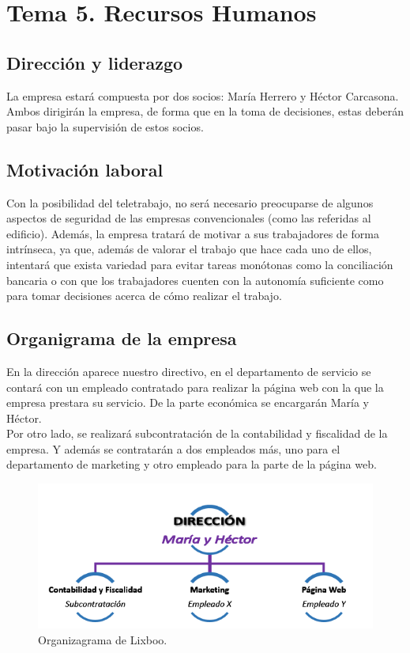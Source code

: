 \documentclass[openany,overnay,a4paper, twoside, 12pt]{book}
\begin{document}
\chapter*{Tema 5. Recursos Humanos}
\setcounter{section}{0}
\section{Dirección y liderazgo}
La empresa estará compuesta por dos socios: María Herrero y Héctor Carcasona. Ambos dirigirán la empresa, de forma que en la toma de decisiones, estas deberán pasar bajo la supervisión de estos socios.
\section{Motivación laboral}
Con la posibilidad del teletrabajo, no será necesario preocuparse de algunos aspectos de seguridad de las empresas convencionales (como las referidas al edificio).
Además, la empresa tratará de motivar a sus trabajadores de forma intrínseca, ya que, además de valorar el trabajo que hace cada uno de ellos, intentará que exista variedad para evitar tareas monótonas como la conciliación bancaria o con que los trabajadores cuenten con la autonomía suficiente como para tomar decisiones acerca de cómo realizar el trabajo.
\section{Organigrama de la empresa}
En la dirección aparece nuestro directivo, en el departamento de servicio se contará con un empleado contratado para realizar la página web con la que la empresa prestara su servicio. De la parte económica se encargarán María y Héctor.\\
Por otro lado, se realizará subcontratación de la contabilidad y fiscalidad de la empresa. Y además se contratarán a dos empleados más, uno para el departamento de marketing y otro empleado para la parte de la página web.

\begin{figure}[h]
\includegraphics[scale = 0.8]{imagenes/organigrama.png}
\centering\renewcommand{\thefigure}{}
\caption{Organizagrama de Lixboo.}
\end{figure}
\end{document}
